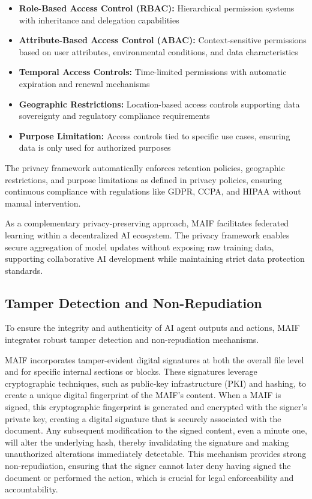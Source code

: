 \documentclass[conference]{IEEEtran}
\begin{document}
\begin{itemize}[leftmargin=*]
\item \textbf{Role-Based Access Control (RBAC):} Hierarchical permission systems with inheritance and delegation capabilities
\item \textbf{Attribute-Based Access Control (ABAC):} Context-sensitive permissions based on user attributes, environmental conditions, and data characteristics
\item \textbf{Temporal Access Controls:} Time-limited permissions with automatic expiration and renewal mechanisms
\item \textbf{Geographic Restrictions:} Location-based access controls supporting data sovereignty and regulatory compliance requirements
\item \textbf{Purpose Limitation:} Access controls tied to specific use cases, ensuring data is only used for authorized purposes
\end{itemize}

The privacy framework automatically enforces retention policies, geographic restrictions, and purpose limitations as defined in privacy policies, ensuring continuous compliance with regulations like GDPR, CCPA, and HIPAA without manual intervention.

As a complementary privacy-preserving approach, MAIF facilitates federated learning within a decentralized AI ecosystem\cite{ref85}. The privacy framework enables secure aggregation of model updates without exposing raw training data, supporting collaborative AI development while maintaining strict data protection standards.

\subsection{Tamper Detection and Non-Repudiation}

To ensure the integrity and authenticity of AI agent outputs and actions, MAIF integrates robust tamper detection and non-repudiation mechanisms.

MAIF incorporates tamper-evident digital signatures at both the overall file level and for specific internal sections or blocks\cite{ref65}. These signatures leverage cryptographic techniques, such as public-key infrastructure (PKI) and hashing, to create a unique digital fingerprint of the MAIF's content\cite{ref99}. When a MAIF is signed, this cryptographic fingerprint is generated and encrypted with the signer's private key, creating a digital signature that is securely associated with the document\cite{ref99}. Any subsequent modification to the signed content, even a minute one, will alter the underlying hash, thereby invalidating the signature and making unauthorized alterations immediately detectable\cite{ref65}. This mechanism provides strong non-repudiation, ensuring that the signer cannot later deny having signed the document or performed the action, which is crucial for legal enforceability and accountability\cite{ref65}.
\end{document}
